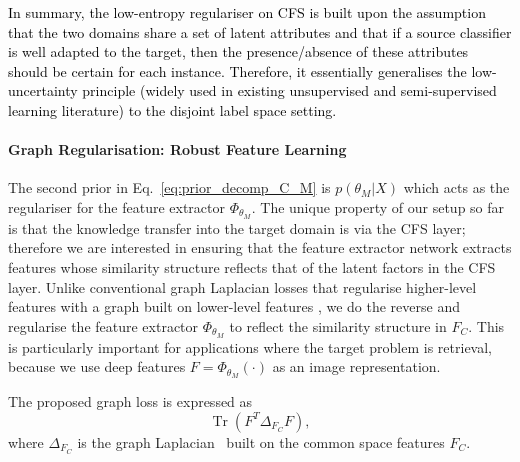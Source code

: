 \documentclass[letterpaper]{article} \usepackage{aaai19}  \usepackage{times}  \usepackage{helvet}  \usepackage{courier}  \usepackage{url}  \usepackage{graphicx}
\begin{document}
\textcolor{black}{In summary, the low-entropy regulariser on CFS is built upon the assumption that the two domains share a set of latent attributes and that if a source classifier is well adapted to the target, then the presence/absence of these attributes should be certain for each instance. Therefore, it essentially generalises the low-uncertainty principle (widely used in existing unsupervised and semi-supervised learning literature) to the disjoint label space setting.}


\paragraph{Graph Regularisation: Robust Feature Learning}
The second prior in Eq.~\ref{eq:prior_decomp_C_M} is $p(\theta_M | X)$ which acts as the regulariser for the feature extractor $\Phi_{\theta_M}$. The unique property of our setup so far is that the knowledge transfer into the target domain is via the CFS layer; therefore we are interested in ensuring that the feature extractor network extracts features whose similarity structure reflects that of the latent factors in the CFS layer. Unlike conventional graph Laplacian losses that regularise higher-level features with a graph built on lower-level features \cite{belkin2006laprlsSSL,zhu2006semi}, we do the reverse and regularise the feature extractor $\Phi_{\theta_M}$ to reflect the similarity structure in $F_C$.  This is particularly important for applications where the target problem is retrieval, because we use deep features $F=\Phi_{\theta_M}(\cdot)$ as an image representation.

The proposed graph loss is expressed as
\begin{equation}\label{eq:graph_loss}
	\operatorname{Tr}(F^{T} \Delta_{F_C} F),
\end{equation}
where  $\Delta_{F_C}$ is the graph Laplacian~\cite{cai2011graph} built on the common space features $F_C$.
\end{document}

